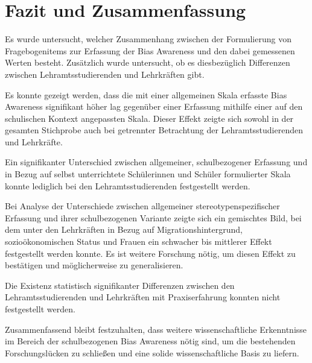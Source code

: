 \chapter{Fazit und Zusammenfassung}
\label{ch:fazit-zusammenfassung}

Es wurde untersucht, welcher Zusammenhang zwischen der Formulierung von Fragebogenitems zur Erfassung der Bias Awareness und den dabei gemessenen Werten besteht.
Zusätzlich wurde untersucht, ob es diesbezüglich Differenzen zwischen Lehramtsstudierenden und Lehrkräften gibt.

Es konnte gezeigt werden, dass die mit einer allgemeinen Skala erfasste Bias Awareness signifikant höher lag gegenüber einer Erfassung mithilfe einer auf den schulischen Kontext angepassten Skala.
Dieser Effekt zeigte sich sowohl in der gesamten Stichprobe auch bei getrennter Betrachtung der Lehramtsstudierenden und Lehrkräfte.

Ein signifikanter Unterschied zwischen allgemeiner, schulbezogener Erfassung und in Bezug auf selbst unterrichtete Schülerinnen und Schüler formulierter Skala konnte lediglich bei den Lehramtsstudierenden festgestellt werden.

Bei Analyse der Unterschiede zwischen allgemeiner stereotypenspezifischer Erfassung und ihrer schulbezogenen Variante zeigte sich ein gemischtes Bild, bei dem unter den Lehrkräften in Bezug auf Migrationshintergrund, sozioökonomischen Status und Frauen ein schwacher bis mittlerer Effekt festgestellt werden konnte.
Es ist weitere Forschung nötig, um diesen Effekt zu bestätigen und möglicherweise zu generalisieren.

Die Existenz statistisch signifikanter Differenzen zwischen den Lehramtsstudierenden und Lehrkräften mit Praxiserfahrung konnten nicht festgestellt werden.

Zusammenfassend bleibt festzuhalten, dass weitere wissenschaftliche Erkenntnisse im Bereich der schulbezogenen Bias Awareness nötig sind, um die bestehenden Forschungslücken zu schließen und eine solide wissenschaftliche Basis zu liefern.